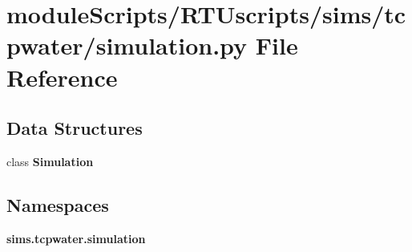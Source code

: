 \section{module\+Scripts/\+R\+T\+Uscripts/sims/tcpwater/simulation.py File Reference}
\label{tcpwater_2simulation_8py}
\subsection*{Data Structures}
\begin{DoxyCompactItemize}
\item 
class {\bf Simulation}
\end{DoxyCompactItemize}
\subsection*{Namespaces}
\begin{DoxyCompactItemize}
\item 
 {\bf sims.\+tcpwater.\+simulation}
\end{DoxyCompactItemize}

